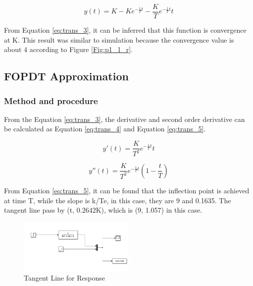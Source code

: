 \documentclass[11pt, a4paper]{article}
\begin{document}
\begin{equation}
y(t) = K-Ke^{-\frac{1}{T}t}-\frac{K}{T}e^{-\frac{1}{T}t}t
\label{eq:trans_3}
\end{equation}

From Equation \ref{eq:trans_3}, it can be inferred that this function is convergence at K. This result was similar to simulation because the convergence value is about 4 according to Figure \ref{Fig:p1_1_r}.

\subsection{FOPDT Approximation}

\subsubsection{Method and procedure}

From the Equation \ref{eq:trans_3}, the derivative and second order derivative can be calculated as Equation \ref{eq:trans_4} and Equation \ref{eq:trans_5}.

\begin{equation}
y'(t) = \frac{K}{T^2}e^{-\frac{1}{T}t}t
\label{eq:trans_4}
\end{equation}

\begin{equation}
y''(t) = \frac{K}{T^2}e^{-\frac{1}{T}t}(1-\frac{t}{T})
\label{eq:trans_5}
\end{equation}

From Equation \ref{eq:trans_5}, it can be found that the inflection point is achieved at time T, while the slope is k/Te, in this case, they are 9 and 0.1635. The tangent line pass by (t, 0.2642K), which is (9, 1.057) in this case.


\begin{figure}[htbp]     \begin{centering}
    \includegraphics[width=0.5\textwidth]{p1_2.png}
    \caption{\label{Fig:p1_2}Tangent Line for Response}
    \end{centering}
    
\end{figure}
\end{document}
